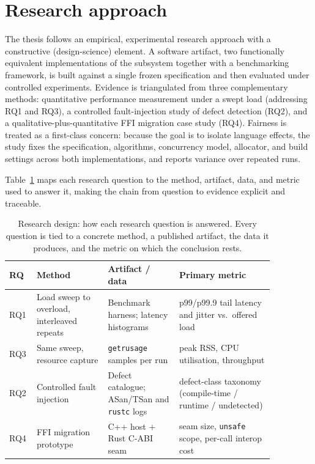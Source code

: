\documentclass[english,twoside,openright,a4paper,censored,csm,software-track-2020]{HYthesisML}
\begin{document}
\section{Research approach}
The thesis follows an empirical, experimental research approach with a constructive
(design-science) element. A software artifact, two functionally equivalent implementations
of the subsystem together with a benchmarking framework, is built against a single frozen
specification and then evaluated under controlled experiments. Evidence is triangulated from
three complementary methods: quantitative performance measurement under a swept load
(addressing RQ1 and RQ3), a controlled fault-injection study of defect detection (RQ2), and
a qualitative-plus-quantitative FFI migration case study (RQ4). Fairness is treated as a
first-class concern: because the goal is to isolate language effects, the study fixes the
specification, algorithms, concurrency model, allocator, and build settings across both
implementations, and reports variance over repeated runs.

Table~\ref{tab:design} maps each research question to the method, artifact, data, and metric
used to answer it, making the chain from question to evidence explicit and traceable.

\begin{table}
\centering
\caption{Research design: how each research question is answered. Every question is tied to a
concrete method, a published artifact, the data it produces, and the metric on which the
conclusion rests.\label{tab:design}}
\renewcommand{\arraystretch}{1.25}
\begin{tabular}{@{}p{0.06\linewidth} p{0.24\linewidth} p{0.24\linewidth} p{0.32\linewidth}@{}}
\hline\hline
RQ & Method & Artifact / data & Primary metric \\
\hline
RQ1 & Load sweep to overload, interleaved repeats & Benchmark harness; latency histograms &
p99/p99.9 tail latency and jitter vs.\ offered load \\
RQ3 & Same sweep, resource capture & \texttt{getrusage} samples per run &
peak RSS, CPU utilisation, throughput \\
RQ2 & Controlled fault injection & Defect catalogue; ASan/TSan and \texttt{rustc} logs &
defect-class taxonomy (compile-time / runtime / undetected) \\
RQ4 & FFI migration prototype & C++ host $+$ Rust C-ABI seam &
seam size, \texttt{unsafe} scope, per-call interop cost \\
\hline
\end{tabular}
\end{table}
\end{document}
